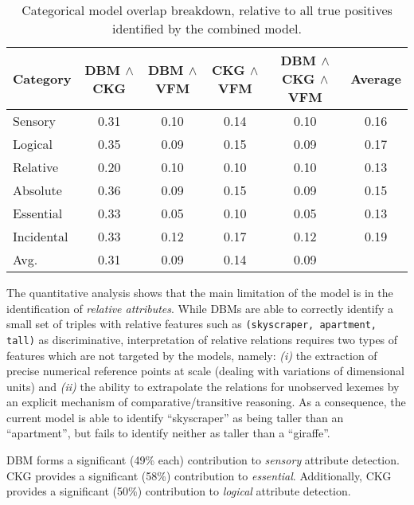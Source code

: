 \documentclass[11pt,a4paper]{article}
\begin{document}
\begin{table*}[!htb]
    \centering
    \begin{center}
        \begin{tabularx}{\textwidth}{ |X|c|c|c|c|c| }
            \hline
            \textbf{Category} & \textbf{DBM} $\land$ \textbf{CKG} & \textbf{DBM} $\land$ \textbf{VFM} & \textbf{CKG} $\land$ \textbf{VFM} & \textbf{DBM} $\land$ \textbf{CKG} $\land$ \textbf{VFM} & \textbf{Average}\\
            \hline
            Sensory & 0.31 & 0.10 & 0.14 & 0.10 & 0.16\\
           	Logical & 0.35 & 0.09 & 0.15 & 0.09 & 0.17\\
            Relative & 0.20 & 0.10 & 0.10 & 0.10 & 0.13 \\
            Absolute & 0.36 & 0.09 & 0.15 & 0.09 & 0.15\\
            Essential & 0.33 & 0.05 & 0.10 & 0.05 & 0.13\\
            Incidental & 0.33 & 0.12 & 0.17 & 0.12 & 0.19\\
            \hhline{|=|=|=|=|=|=|}
            Avg. & 0.31 & 0.09 & 0.14 & 0.09 &  \\
			\hline
		\end{tabularx}
    \end{center}
    \caption{Categorical model overlap breakdown, relative to all true positives identified by the combined model.}
    \label{table:categorizedOverl}
\end{table*}

The quantitative analysis shows that the main limitation of the model is in the identification of \textit{relative attributes}. While DBMs are able to correctly identify a small set of triples with relative features such as \texttt{(skyscraper, apartment, tall)} as discriminative, interpretation of relative relations requires two types of features which are not targeted by the models, namely: \emph{(i)} the extraction of precise numerical reference points at scale (dealing with variations of dimensional units) and \emph{(ii)} the ability to extrapolate the relations for unobserved lexemes by an explicit mechanism of comparative/transitive reasoning. As a consequence, the current model is able to identify ``skyscraper'' as being taller than an ``apartment'', but fails to identify neither as taller than a ``giraffe''.
	
DBM forms a significant (49\% each) contribution to \emph{sensory} attribute detection. CKG provides a significant (58\%) contribution to \emph{essential}. Additionally, CKG provides a significant (50\%) contribution to \emph{logical} attribute detection.
\end{document}
